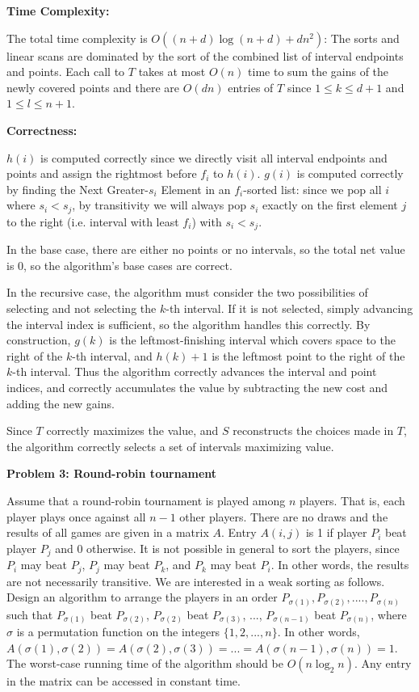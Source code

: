 \documentclass[letterpaper,12pt]{article}
\begin{document}
\vspace{2mm}
\textbf{Time Complexity:}

The total time complexity is $O((n+d)\log(n+d) + dn^2)$: The sorts and linear
scans are dominated by the sort of the combined list of interval endpoints and
points. Each call to $T$ takes at most $O(n)$ time to sum the gains of the newly
covered points and there are $O(dn)$ entries of $T$ since $1 \leq k \leq d+1$ and $1 \leq
l \leq n+1$.

\pagebreak

\vspace{2mm}
\textbf{Correctness:}

$h(i)$ is computed correctly since we directly visit all interval endpoints and
points and assign the rightmost before $f_i$ to $h(i)$. $g(i)$ is computed
correctly by finding the Next Greater-$s_i$ Element in an $f_i$-sorted list:
since we pop all $i$ where $s_i < s_j$, by transitivity we will always pop $s_i$
exactly on the first element $j$ to the right (i.e. interval with least $f_i$)
with $s_i < s_j$.

In the base case, there are either no points or no intervals, so the total net
value is 0, so the algorithm's base cases are correct.

In the recursive case, the algorithm must consider the two possibilities of
selecting and not selecting the $k$-th interval. If it is not selected, simply
advancing the interval index is sufficient, so the algorithm handles this
correctly. By construction, $g(k)$ is the leftmost-finishing interval which
covers space to the right of the $k$-th interval, and $h(k) + 1$ is the leftmost
point to the right of the $k$-th interval. Thus the algorithm correctly advances
the interval and point indices, and correctly accumulates the value by
subtracting the new cost and adding the new gains.

Since $T$ correctly maximizes the value, and $S$ reconstructs the choices made
in $T$, the algorithm correctly selects a set of intervals maximizing value.

\pagebreak

\noindent\textbf{Problem 3: Round-robin tournament}

Assume that a round-robin tournament is played among $n$ players. That is, each
player plays once against all $n - 1$ other players. There are no draws and the
results of all games are given in a matrix $A$. Entry $A(i,j)$ is 1 if player
$P_i$ beat player $P_j$ and 0 otherwise. It is not possible in general to sort
the players, since $P_i$ may beat $P_j$, $P_j$ may beat $P_k$, and $P_k$ may
beat $P_i$. In other words, the results are not necessarily transitive. We are
interested in a weak sorting as follows. Design an algorithm to arrange the
players in an order $P_{\sigma(1)}, P_{\sigma(2)}, ...., P_{\sigma(n)}$ such that $P_{\sigma(1)}$
beat $P_{\sigma(2)}$, $P_{\sigma(2)}$ beat $P_{\sigma(3)}$, ..., $P_{\sigma(n-1)}$ beat $P_{\sigma(n)}$,
where $\sigma$ is a permutation function on the integers $\{1,2,...,n\}$. In other
words, $A(\sigma(1), \sigma(2)) = A(\sigma(2), \sigma(3)) = ... = A(\sigma(n-1), \sigma(n)) = 1$. The
worst-case running time of the algorithm should be $O(n \log_2 n)$. Any entry in
the matrix can be accessed in constant time.
\end{document}
